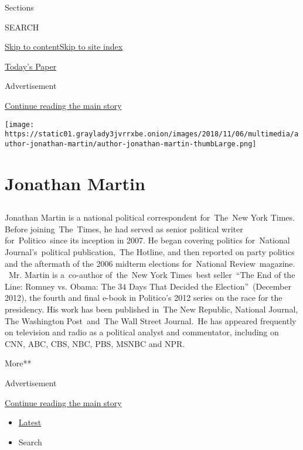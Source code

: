 Sections

SEARCH

\protect\hyperlink{site-content}{Skip to
content}\protect\hyperlink{site-index}{Skip to site index}

\href{https://myaccount.nytimes3xbfgragh.onion/auth/login?response_type=cookie\&client_id=vi}{}

\href{https://www.nytimes3xbfgragh.onion/section/todayspaper}{Today's
Paper}

Advertisement

\protect\hyperlink{after-top}{Continue reading the main story}

\texttt{[image: https://static01.graylady3jvrrxbe.onion/images/2018/11/06/multimedia/author-jonathan-martin/author-jonathan-martin-thumbLarge.png]}

\hypertarget{jonathan-martin}{%
\section{Jonathan Martin}\label{jonathan-martin}}

\subsection{}

Jonathan Martin is a national political correspondent for~The~New York
Times. Before joining~The~Times, he had served as senior political
writer for~Politico~since its inception in 2007. He began covering
politics for~National Journal's~political publication,~The Hotline, and
then reported on party politics and the aftermath of the 2006 midterm
elections for~National Review~magazine. ~Mr. Martin is a~co-author
of~the~New York Times~best seller~``The End of the Line: Romney vs.
Obama: The 34 Days That Decided the Election''~(December 2012), the
fourth and final e-book in Politico's 2012 series on the race for the
presidency. His work has been published in~The New Republic, National
Journal, The Washington Post~and~The Wall Street Journal.~He has
appeared frequently on television and radio as a political analyst and
commentator, including on CNN, ABC, CBS, NBC, PBS, MSNBC and NPR.

More**

Advertisement

\protect\hyperlink{after-mid1}{Continue reading the main story}

\begin{itemize}
\tightlist
\item
  \protect\hyperlink{stream-panel}{Latest}
\item
  Search
\end{itemize}

